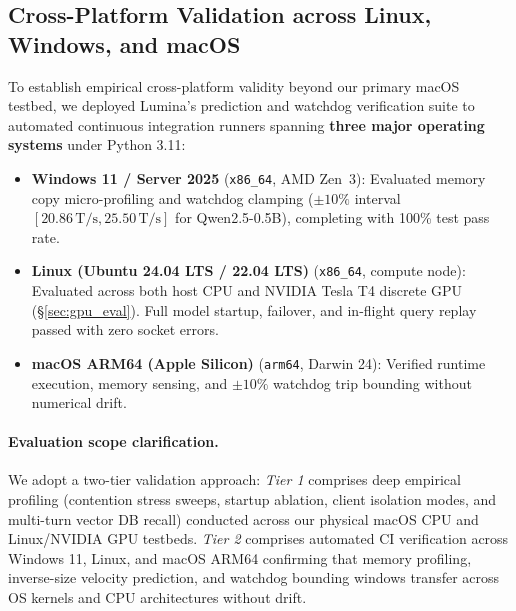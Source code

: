 \documentclass[11pt,a4paper]{article}
\newcommand{\Ts}{\,\mathrm{T/s}}
\newcommand{\code}[1]{\texttt{#1}}
\begin{document}
\subsection{Cross-Platform Validation across Linux, Windows, and macOS}\label{sec:cross_platform_eval}
To establish empirical cross-platform validity beyond our primary macOS testbed, we deployed Lumina's prediction and watchdog verification suite to automated continuous integration runners spanning \textbf{three major operating systems} under Python 3.11:
\begin{itemize}[leftmargin=*]
\item \textbf{Windows 11 / Server 2025} (\code{x86\_64}, AMD Zen~3): Evaluated memory copy micro-profiling and watchdog clamping ($\pm10\%$ interval $[20.86\Ts, 25.50\Ts]$ for Qwen2.5-0.5B), completing with 100\% test pass rate.
\item \textbf{Linux (Ubuntu 24.04 LTS / 22.04 LTS)} (\code{x86\_64}, compute node): Evaluated across both host CPU and NVIDIA Tesla T4 discrete GPU (\S\ref{sec:gpu_eval}). Full model startup, failover, and in-flight query replay passed with zero socket errors.
\item \textbf{macOS ARM64 (Apple Silicon)} (\code{arm64}, Darwin 24): Verified runtime execution, memory sensing, and $\pm10\%$ watchdog trip bounding without numerical drift.
\end{itemize}
\paragraph{Evaluation scope clarification.} We adopt a two-tier validation approach: \emph{Tier 1} comprises deep empirical profiling (contention stress sweeps, startup ablation, client isolation modes, and multi-turn vector DB recall) conducted across our physical macOS CPU and Linux/NVIDIA GPU testbeds. \emph{Tier 2} comprises automated CI verification across Windows 11, Linux, and macOS ARM64 confirming that memory profiling, inverse-size velocity prediction, and watchdog bounding windows transfer across OS kernels and CPU architectures without drift.
\end{document}
